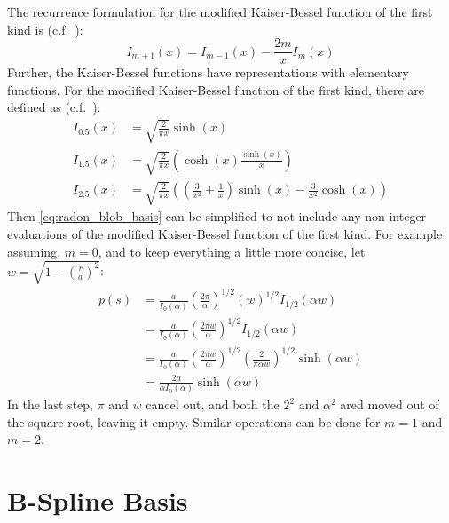 The recurrence formulation for the modified Kaiser-Bessel function of the first kind is
(c.f.~\cite[chapter 9]{abramowitz_handbook_1972}):
\begin{equation}\label{eq:kaiser_bessel_recurrence}
	I_{m+1}(x) = I_{m-1}(x) - \frac{2 m}{x}I_m(x)
\end{equation}
Further, the Kaiser-Bessel functions have representations with elementary functions. For the
modified Kaiser-Bessel function of the first kind, there are defined as (c.f.~\cite[chapter 10]{abramowitz_handbook_1972}):
\begin{align}\label{eq:kaiser_bessel_half_integer}
	I_{0.5}(x) & = \sqrt{\frac{2}{\pi x}} \sinh(x)                                                                               \\
	I_{1.5}(x) & = \sqrt{\frac{2}{\pi x}} \left( \cosh(x) \frac{\sinh(x)}{x} \right)                                             \\
	I_{2.5}(x) & = \sqrt{\frac{2}{\pi x}} \left(\left(\frac{3}{x^2} + \frac{1}{x}\right)\sinh(x) - \frac{3}{x^2} \cosh(x)\right)
\end{align}
Then \autoref{eq:radon_blob_basis} can be simplified to not include any non-integer evaluations of
the modified Kaiser-Bessel function of the first kind. For example assuming, \(m = 0\), and to keep
everything a little more concise, let \(w = \sqrt{1 - \left(\frac{r}{a}\right)^2}\):
\begin{align}\label{eq:radon_blob_basis_order_0_simplified}
	p(s) & = \frac{a}{I_0(\alpha)} \left(\frac{2\pi}{\alpha}\right)^{1/2} \left( w \right)^{1/2} I_{1/2}\left( \alpha w \right)                     \\
	     & = \frac{a}{I_0(\alpha)} \left(\frac{2\pi w}{\alpha}\right)^{1/2} I_{1/2}\left( \alpha w \right)                                          \\
	     & = \frac{a}{I_0(\alpha)} \left(\frac{2\pi w}{\alpha}\right)^{1/2} \left( \frac{2}{\pi \alpha w}\right)^{1/2} \sinh \left(\alpha w \right) \\
	     & = \frac{2 a}{\alpha I_0(\alpha)} \sinh \left(\alpha w \right)
\end{align}
In the last step, \(\pi\) and \(w\) cancel out, and both the \(2^2\) and \(\alpha^2\) ared moved out
of the square root, leaving it empty. Similar operations can be done for \(m = 1\) and \(m = 2\).

\section{B-Spline Basis}\label{sec:bspline_basis}

